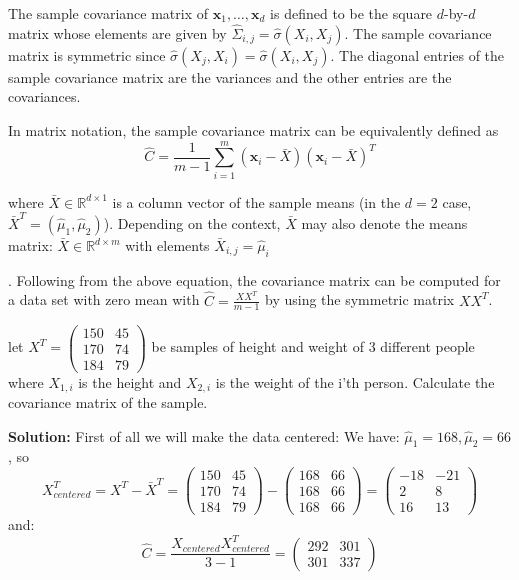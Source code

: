 {The sample covariance matrix of $\mathbf{x}_1,\ldots,\mathbf{x}_d$ is defined to be the square $d$-by-$d$ matrix whose elements are given by $\hat{\Sigma}_{i,j}=\hat{\sigma}\left(X_{i},X_{j}\right)$. The sample covariance matrix is symmetric since $\hat{\sigma}\left(X_{j},X_{i}\right)=\hat{\sigma}\left(X_{i},X_{j}\right)$. The diagonal entries of the sample covariance matrix are the variances and the other entries are the covariances. 

In matrix notation, the sample covariance matrix can be equivalently defined as
$$\hat{C} = \frac{1}{m-1} \sum^{m}_{i=1}{(\mathbf{x}_i-\bar{X})(\mathbf{x}_i-\bar{X})^T}$$


where $\bar{X} \in\mathbb{R}^{d\times 1}$ is a column vector of the sample means (in the $d=2$ case, $\bar{X}^T = (\hat{\mu}_1, \hat{\mu}_2)$).  Depending on the context, $\bar{X}$ may also denote the means matrix: $\bar{X} \in\mathbb{R}^{d\times m}$ with elements $\bar{X}_{i,j}=\hat{\mu}_i$}.  Following from the above equation, the covariance matrix can be computed for a data set with zero mean with $\hat{C} = \frac{XX^T}{m-1}$ by using the symmetric matrix $XX^T$.

\begin{exercise}
let $X^T=\left(\begin{array}{cc}
150 & 45\\
170 & 74\\
184 & 79
\end{array}\right)$ be samples of height and weight of 3 different people where $X_{1, i}$ is the height and $X_{2, i}$ is the weight of the i'th person. Calculate the covariance matrix of the sample.
\end{exercise}
\textbf{Solution:} First of all we will make the data centered:
We have: $\hat{\mu}_1=168, \hat{\mu}_2=66$, so $$X_{centered}^{T}=X^T - \bar{X}^T =\left(\begin{array}{cc}
150 & 45\\
170 & 74\\
184 & 79
\end{array}\right) - \left(\begin{array}{cc}
168 & 66\\
168 & 66\\
168 & 66
\end{array}
\right)
=\left(\begin{array}{cc}
-18 & -21\\
2 & 8\\
16 & 13
\end{array}\right)$$
and:
$$
\hat{C} = \frac{X_{centered}X_{centered}^{T}}{3-1}=\left(\begin{array}{cc}
292 & 301\\
301 & 337
\end{array}\right)
$$


